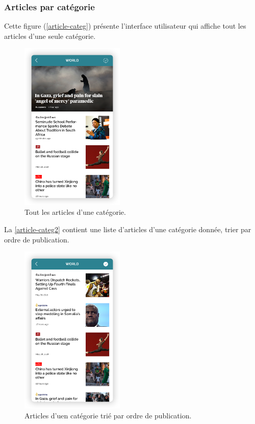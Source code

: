     \subsubsection{Articles par catégorie}
    Cette figure (\autoref{article-categ}) présente l'interface utilisateur qui affiche tout les articles d'une seule catégorie. 
        \begin{figure}[H]
            \centering
            \includegraphics[width=140pt]{img/chapter4/feedny/en-categ-articles1.png}
            \caption{Tout les articles d'une catégorie.}
            \label{article-categ}
        \end{figure}

    La \autoref{article-categ2} contient une liste d'articles d'une catégorie donnée, trier par ordre de publication.
        \begin{figure}[H]
            \centering
            \includegraphics[width=140pt]{img/chapter4/feedny/en-categ-articles.png}
            \caption{Articles d'uen catégorie trié par ordre de publication.}
            \label{article-categ2}
        \end{figure}

